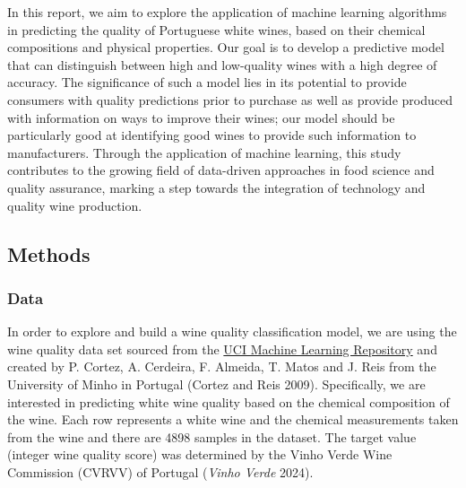 \documentclass[
  letterpaper,
  DIV=11,
  numbers=noendperiod]{scrartcl}
\begin{document}
In this report, we aim to explore the application of machine learning
algorithms in predicting the quality of Portuguese white wines, based on
their chemical compositions and physical properties. Our goal is to
develop a predictive model that can distinguish between high and
low-quality wines with a high degree of accuracy. The significance of
such a model lies in its potential to provide consumers with quality
predictions prior to purchase as well as provide produced with
information on ways to improve their wines; our model should be
particularly good at identifying good wines to provide such information
to manufacturers. Through the application of machine learning, this
study contributes to the growing field of data-driven approaches in food
science and quality assurance, marking a step towards the integration of
technology and quality wine production.

\subsection{Methods}\label{methods}

\subsubsection{Data}\label{data}

In order to explore and build a wine quality classification model, we
are using the wine quality data set sourced from the
\href{https://archive.ics.uci.edu/dataset/186/wine+quality}{UCI Machine
Learning Repository} and created by P. Cortez, A. Cerdeira, F. Almeida,
T. Matos and J. Reis from the University of Minho in Portugal (Cortez
and Reis 2009). Specifically, we are interested in predicting white wine
quality based on the chemical composition of the wine. Each row
represents a white wine and the chemical measurements taken from the
wine and there are 4898 samples in the dataset. The target value
(integer wine quality score) was determined by the Vinho Verde Wine
Commission (CVRVV) of Portugal (\emph{Vinho Verde} 2024).
\end{document}
